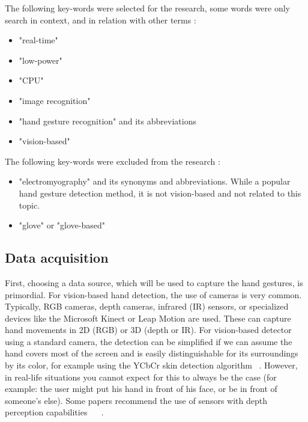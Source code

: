 \documentclass[12pt]{article}
\begin{document}
The following key-words were selected for the research, some words were only search in context, and in relation with other terms :
\begin{itemize}
  \item "real-time"
  \item "low-power"
  \item "CPU"
  \item "image recognition"
  \item "hand gesture recognition" and its abbreviations
  \item "vision-based"
\end{itemize}

The following key-words were excluded from the research :
\begin{itemize}
  \item "electromyography" and its synonyms and abbreviations. While a popular hand gesture detection method, it is not vision-based and not related to this topic.
  \item "glove" or "glove-based"
\end{itemize}

\subsection{Data acquisition}

First, choosing a data source, which will be used to capture the hand gestures, is primordial. For vision-based hand detection, the use of cameras is very common. Typically, RGB cameras, depth cameras, infrared (IR) sensors, or specialized devices like the Microsoft Kinect or Leap Motion are used. These can capture hand movements in 2D (RGB) or 3D (depth or IR).
For vision-based detector using a standard camera, the detection can be simplified if we can assume the hand covers most of the screen and is easily distinguishable for its surroundings by its color, for example using the YCbCr skin detection algorithm ~\cite{AIBINU20121183}.
However, in real-life situations you cannot expect for this to always be the case (for example: the user might put his hand in front of his face, or be in front of someone's else). Some papers recommend the use of sensors with depth perception capabilities ~\cite{sahoo2022real} ~\cite{qi2024computer}.
\end{document}
